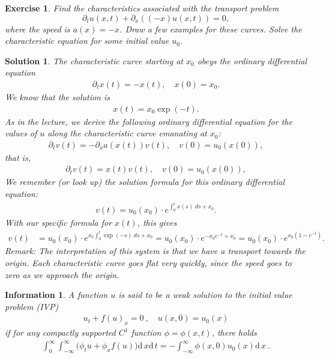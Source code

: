 \documentclass[10pt,letterpaper]{article}
\newcommand{\dif}[1][]{\mathrm{d} {#1}\,}
\theoremstyle{break}
\newtheorem{exercise}{Exercise}
\newtheorem*{information}{Information}
\newtheorem{mysolution}{Solution}
\newenvironment{solution}{\begin{mysolution}}{\end{mysolution}}
\begin{document}
\begin{exercise}
    Find the characteristics associated with the transport problem 
    $$
        \partial_t u(x,t) + \partial_x\left( (-x) u(x,t) \right) = 0,
    $$
    where the speed is $a(x) = -x$.
    Draw a few examples for these curves. 
    Solve the characteristic equation for some initial value $u_0$.
\end{exercise}
\begin{solution}
    The characteristic curve starting at $x_0$ obeys the ordinary differential equation 
    \begin{align*}
        \partial_t x(t) = - x(t), \quad x(0) = x_0.
    \end{align*}
    We know that the solution is 
    \begin{align*}
        x(t) = x_0 \exp(-t).
    \end{align*}
    As in the lecture, we derive the following ordinary differential equation 
    for the values of $u$ along the characteristic curve emanating at $x_0$: 
    \begin{align*}
        \partial_t v(t) = - \partial_x a( x(t) ) v(t), \quad v(0) = u_0( x(0) ), 
    \end{align*}
    that is, 
    \begin{align*}
        \partial_t v(t) = x(t) v(t), \quad v(0) = u_0( x(0) ), 
    \end{align*}
    We remember (or look up) the solution formula for this ordinary differential equation:
    \begin{align*}
        v(t) = u_0(x_0) \cdot e^{\int_0^t x(s) \;ds + x_0}.
    \end{align*}
    With our specific formula for $x(t)$, this gives 
    \begin{align*}
        v(t) 
        &
        = 
        u_0(x_0) \cdot e^{x_0 \int_0^t \exp(-s) \;ds + x_0}
        = 
        u_0(x_0) \cdot e^{ - x_0 e^{-t} + x_0}
        = 
        u_0(x_0) \cdot e^{ x_0 ( 1 - e^{-t} ) }
        .
    \end{align*}
    \textit{Remark: 
    The interpretation of this system is that we have a transport towards the origin.
    Each characteristic curve goes flat very quickly,
    since the speed goes to zero as we approach the origin. 
    }
\end{solution}





\begin{information}
	A function $u$ is said to be a \emph{weak solution} to the initial value problem (IVP)
	\begin{gather} \label{conLaw}
		u_t+f(u)_x=0\ ,
		\quad
		u(x,0)=u_0(x)
	\end{gather}%
	if for any compactly supported $C^1$ function $\phi=\phi(x,t)$, there holds
	\begin{gather}%
		\int_0^\infty \int_{-\infty}^\infty \Big( \phi_t u +\phi_x f(u)\Big)\dif x\dif t
		=
		-\int_{-\infty}^\infty \phi(x,0)u_0(x)\dif x\ .
	\end{gather}%
\end{information}
\end{document}
